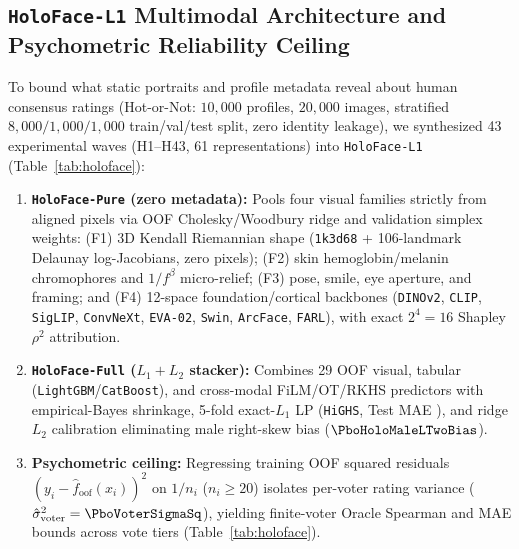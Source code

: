 \subsection{\texorpdfstring{\texttt{HoloFace-L1}}{HoloFace-L1} Multimodal Architecture and Psychometric Reliability Ceiling}
To bound what static portraits and profile metadata reveal about human consensus ratings (Hot-or-Not: $10{,}000$ profiles, $20{,}000$ images, stratified $8{,}000 / 1{,}000 / 1{,}000$ train/val/test split, zero identity leakage), we synthesized 43 experimental waves (H1--H43, 61 representations) into \texttt{HoloFace-L1} (Table~\ref{tab:holoface}):
\begin{enumerate}[leftmargin=1.4em,itemsep=0.5pt,topsep=1.5pt]
\item \textbf{\texttt{HoloFace-Pure} (zero metadata):} Pools four visual families strictly from aligned pixels via OOF Cholesky/Woodbury ridge and validation simplex weights: (F1) 3D Kendall Riemannian shape (\texttt{1k3d68} + 106-landmark Delaunay log-Jacobians, zero pixels); (F2) skin hemoglobin/melanin chromophores and $1/f^\beta$ micro-relief; (F3) pose, smile, eye aperture, and framing; and (F4) 12-space foundation/cortical backbones (\texttt{DINOv2}, \texttt{CLIP}, \texttt{SigLIP}, \texttt{ConvNeXt}, \texttt{EVA-02}, \texttt{Swin}, \texttt{ArcFace}, \texttt{FARL}), with exact $2^4=16$ Shapley $\rho^2$ attribution.
\item \textbf{\texttt{HoloFace-Full} ($L_1 + L_2$ stacker):} Combines 29 OOF visual, tabular (\texttt{LightGBM}/\texttt{CatBoost}), and cross-modal FiLM/OT/RKHS predictors with empirical-Bayes shrinkage, 5-fold exact-$L_1$ LP (\texttt{HiGHS}, Test MAE \PboHoloFullTestMAE), and ridge $L_2$ calibration eliminating male right-skew bias ($\PboHoloMaleLTwoBias$).
\item \textbf{Psychometric ceiling:} Regressing training OOF squared residuals $(y_i-\hat f_{\text{oof}}(x_i))^2$ on $1/n_i$ ($n_i\ge 20$) isolates per-voter rating variance ($\hat\sigma_{\text{voter}}^2=\PboVoterSigmaSq$), yielding finite-voter Oracle Spearman and MAE bounds across vote tiers (Table~\ref{tab:holoface}).
\end{enumerate}

